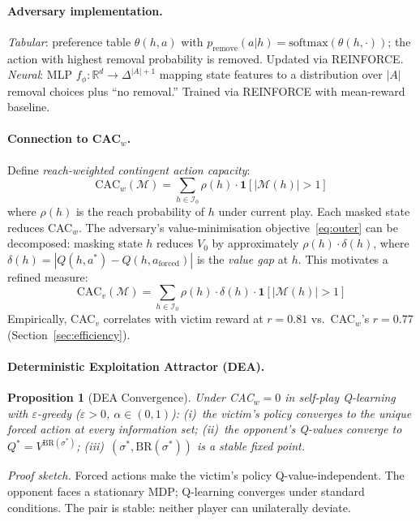 \documentclass{article}
\newtheorem{proposition}{Proposition}
\begin{document}
\paragraph{Adversary implementation.}
\emph{Tabular}: preference table $\theta(h, a)$ with $p_{\text{remove}}(a|h) = \text{softmax}(\theta(h,\cdot))$; the action with highest removal probability is removed. Updated via REINFORCE.
\emph{Neural}: MLP $f_\phi: \mathbb{R}^d \to \Delta^{|A|+1}$ mapping state features to a distribution over $|A|$ removal choices plus ``no removal.'' Trained via REINFORCE with mean-reward baseline.

\paragraph{Connection to CAC$_w$.}
Define \emph{reach-weighted contingent action capacity}:
\[
\text{CAC}_w(\mathcal{M}) = \sum_{h \in \mathcal{I}_0} \rho(h) \cdot \mathbf{1}[|\mathcal{M}(h)| > 1]
\]
where $\rho(h)$ is the reach probability of $h$ under current play. Each masked state reduces CAC$_w$. The adversary's value-minimisation objective~\eqref{eq:outer} can be decomposed: masking state $h$ reduces $V_0$ by approximately $\rho(h) \cdot \delta(h)$, where $\delta(h) = |Q(h, a^*) - Q(h, a_{\text{forced}})|$ is the \emph{value gap} at $h$. This motivates a refined measure:
\[
\text{CAC}_v(\mathcal{M}) = \sum_{h \in \mathcal{I}_0} \rho(h) \cdot \delta(h) \cdot \mathbf{1}[|\mathcal{M}(h)| > 1]
\]
Empirically, CAC$_v$ correlates with victim reward at $r = 0.81$ vs.\ CAC$_w$'s $r = 0.77$ (Section~\ref{sec:efficiency}).

\paragraph{Deterministic Exploitation Attractor (DEA).}

\begin{proposition}[DEA Convergence]
Under CAC$_w = 0$ in self-play Q-learning with $\varepsilon$-greedy ($\varepsilon > 0$, $\alpha \in (0,1)$):
(i)~the victim's policy converges to the unique forced action at every information set;
(ii)~the opponent's Q-values converge to $Q^* = V^{\text{BR}(\sigma^*)}$;
(iii)~$(\sigma^*, \text{BR}(\sigma^*))$ is a stable fixed point.
\end{proposition}

\emph{Proof sketch.} Forced actions make the victim's policy Q-value-independent. The opponent faces a stationary MDP; Q-learning converges under standard conditions. The pair is stable: neither player can unilaterally deviate.
\end{document}
